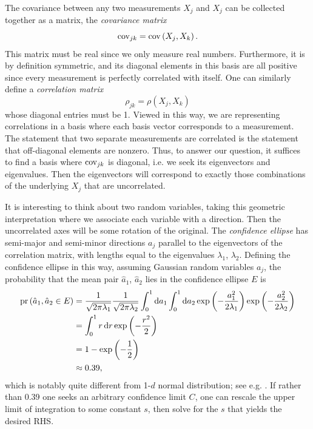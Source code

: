 The covariance between any two measurements $X_j$ and $X_j$ can be
collected together as a matrix, the 
{\it covariance matrix}
\begin{equation}
\operatorname{cov}_{jk}=\operatorname{cov}\left(X_j,X_k\right).
\end{equation}
This matrix must be real since we only measure real numbers.
Furthermore, it is by definition symmetric, and its diagonal
elements in this basis are all positive since every measurement
is perfectly correlated with itself. One can similarly define
a {\it correlation matrix}
\begin{equation}
\rho_{jk}=\rho\left(X_j,X_k\right)
\end{equation}
whose diagonal entries must be 1. Viewed in this way, we are
representing correlations in a basis where each basis vector
corresponds to a measurement. The statement that two separate
measurements are correlated is the statement that off-diagonal
elements are nonzero.
Thus, to answer our question, it suffices to find a basis where
$\operatorname{cov}_{jk}$ is diagonal, i.e. we seek its eigenvectors and eigenvalues.
Then the eigenvectors will correspond to exactly those combinations
of the underlying $X_j$ that are uncorrelated.

It is interesting to think about two random variables, taking this
geometric interpretation where we associate each variable with
a direction. Then the uncorrelated axes will be some rotation
of the original. The {\it confidence ellipse}
has semi-major and semi-minor directions $a_j$ parallel to the
eigenvectors of the correlation matrix, with lengths equal
to the eigenvalues $\lambda_1$, $\lambda_2$. 
Defining the confidence ellipse in this way,
assuming Gaussian random variables $a_j$, the probability
that the mean pair $\hat{a}_1$, $\hat{a}_2$ lies
in the confidence ellipse $E$ is
\begin{equation}\begin{aligned}\label{eq:confidenceInt}
\operatorname{pr}\left(\hat{a}_1,\hat{a}_2\in E\right) & =\frac{1}{\sqrt{2 \pi \lambda_1}} \frac{1}{\sqrt{2 \pi \lambda_2}}
\int_0^1 \dd{a_1}\int_0^1\dd{a_2} \exp \left(-\frac{a_1^2}{2 \lambda_1}\right) \exp \left(-\frac{a_2^2}{2 \lambda_2}\right) \\
& = \int_0^1 r \dd{r} \exp \left(-\frac{r^2}{2}\right)\\
&=1-\exp \left(-\frac{1}{2}\right)\\
&\approx0.39,
\end{aligned}\end{equation}
which is notably quite different from 1-$d$ normal distribution;
see e.g. . If rather than 0.39 one seeks
an arbitrary confidence limit $C$, one can rescale the 
upper limit of integration to some constant $s$, 
then solve for the $s$ that yields
the desired RHS.



